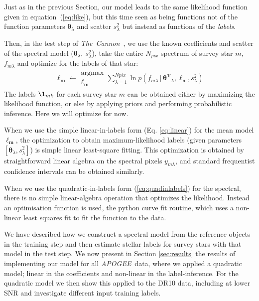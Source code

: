 \documentclass[12pt, preprint]{aastex}
\newcommand{\set}[1]{\bm{#1}}
\newcommand{\given}{\,|\,}
\newcommand{\tc}{\textsl{The~Cannon}}
\newcommand{\apogee}{\textsl{APOGEE}}
\begin{document}
Just as in the previous Section, our model leads to the same likelihood function given in
equation~(\ref{eq:like}), but this time seen as
being functions not of the function parameters $\set{\theta}_\lambda$ and
scatter $s_\lambda^2$ but instead as functions of the \emph{labels}.

Then, in the test step of \tc\ , we use the known coefficients and scatter of the spectral model
($\set{\theta}_\lambda,\ s_\lambda^2$),
take the entire $N_{pix}$ spectrum of survey star $m$, $f_{m\lambda}$ and optimize for the labels of that star:
\begin{eqnarray}
\boldsymbol{\ell_m} \leftarrow \substack{\mbox{argmax}\\
{\boldsymbol{\ell_m}  }}
\sum_{\lambda=1}^{Npix}
\ln p(f_{m\lambda}\given\set{\theta^T}_\lambda, \boldsymbol{\ell_n}, s_\lambda^2)
\label{eq:teststep}
\end{eqnarray} 
The labels $\l_{mk}$ for each survey star $m$ can be obtained either by maximizing
the likelihood function, or else by applying priors
and performing probabilistic inference.
Here we will optimize for now.

When we use the simple linear-in-labels form (Eq. \ref{eq:linear}) for the
mean model $\set{\ell_m}$, the optimization to obtain maximum-likelihood labels
(given parameters $[\set{\theta}_\lambda, s_\lambda^2]$) is simple linear
least-square fitting.
This optimization is obtained by straightforward linear algebra on the
spectral pixels $y_{m\lambda}$, and standard frequentist confidence
intervals can be obtained similarly.

When we use the quadratic-in-labels form (\ref{eq:quadinlabels}) for the
spectral, there is no simple linear-algebra operation that
optimizes the likelihood. 
Instead an optimisation function is used, the python curve$\_$fit routine, which uses a non-linear least squares fit to fit the function to the data. 

We have described how we construct a spectral model from the reference objects in the training step and then 
estimate stellar labels for survey stars with that model in the test step. 
We now present in Section \ref{sec:results} the results of implementing our model for all \apogee\ data, where we applied a quadratic model; linear in the coefficients and non-linear in the label-inference.  
For the quadratic model we then show this applied to the DR10 data, including at lower SNR and investigate different input training labels. 
\end{document}
